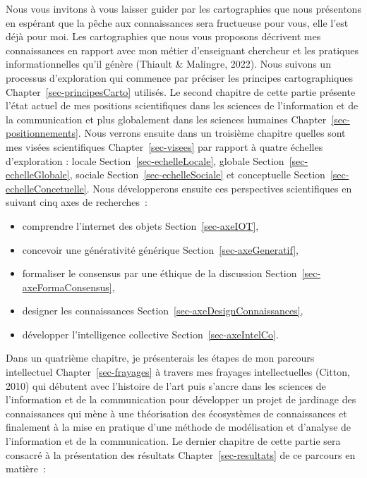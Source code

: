 \documentclass[
  a4paper,
  DIV=11,
  numbers=noendperiod]{scrreprt}
\providecommand{\tightlist}{%
  \setlength{\itemsep}{0pt}\setlength{\parskip}{0pt}}\usepackage{longtable,booktabs,array}
\begin{document}
Nous vous invitons à vous laisser guider par les cartographies que nous
présentons en espérant que la pêche aux connaissances sera fructueuse
pour vous, elle l'est déjà pour moi. Les cartographies que nous vous
proposons décrivent mes connaissances en rapport avec mon métier
d'enseignant chercheur et les pratiques informationnelles qu'il génère
(Thiault \& Malingre, 2022). Nous suivons un processus d'exploration qui
commence par préciser les principes cartographiques
Chapter~\ref{sec-principesCarto} utilisés. Le second chapitre de cette
partie présente l'état actuel de mes positions scientifiques dans les
sciences de l'information et de la communication et plus globalement
dans les sciences humaines Chapter~\ref{sec-positionnements}. Nous
verrons ensuite dans un troisième chapitre quelles sont mes visées
scientifiques Chapter~\ref{sec-visees} par rapport à quatre échelles
d'exploration : locale Section~\ref{sec-echelleLocale}, globale
Section~\ref{sec-echelleGlobale}, sociale
Section~\ref{sec-echelleSociale} et conceptuelle
Section~\ref{sec-echelleConcetuelle}. Nous développerons ensuite ces
perspectives scientifiques en suivant cinq axes de recherches~:

\begin{itemize}
\tightlist
\item
  comprendre l'internet des objets Section~\ref{sec-axeIOT},
\item
  concevoir une générativité générique Section~\ref{sec-axeGeneratif},
\item
  formaliser le consensus par une éthique de la discussion
  Section~\ref{sec-axeFormaConsensus},
\item
  designer les connaissances Section~\ref{sec-axeDesignConnaissances},
\item
  développer l'intelligence collective Section~\ref{sec-axeIntelCo}.
\end{itemize}

Dans un quatrième chapitre, je présenterais les étapes de mon parcours
intellectuel Chapter~\ref{sec-frayages} à travers mes frayages
intellectuelles (Citton, 2010) qui débutent avec l'histoire de l'art
puis s'ancre dans les sciences de l'information et de la communication
pour développer un projet de jardinage des connaissances qui mène à une
théorisation des écosystèmes de connaissances et finalement à la mise en
pratique d'une méthode de modélisation et d'analyse de l'information et
de la communication. Le dernier chapitre de cette partie sera consacré à
la présentation des résultats Chapter~\ref{sec-resultats} de ce parcours
en matière~:
\end{document}
